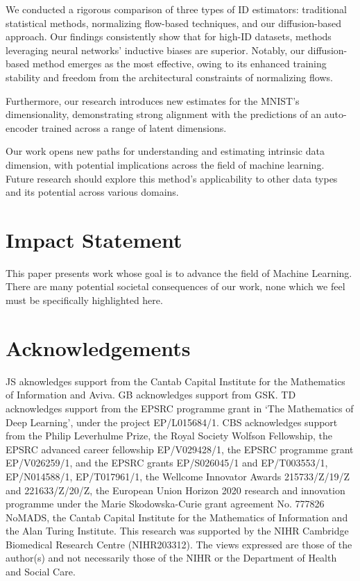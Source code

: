 We conducted a rigorous comparison of three types of ID estimators: traditional statistical methods, normalizing flow-based techniques, and our diffusion-based approach. Our findings consistently show that for high-ID datasets, methods leveraging neural networks' inductive biases are superior. Notably, our diffusion-based method emerges as the most effective, owing to its enhanced training stability and freedom from the architectural constraints of normalizing flows.

Furthermore, our research introduces new estimates for the MNIST's dimensionality, demonstrating strong alignment with the predictions of an auto-encoder trained across a range of latent dimensions.%

Our work opens new paths for understanding and estimating intrinsic data dimension, with potential implications across the field of machine learning. Future research should explore this method's applicability to other data types and its potential across various domains.

\section*{Impact Statement}
This paper presents work whose goal is to advance the field of Machine Learning. There are many potential societal consequences of our work, none which we feel must be specifically highlighted here.

\section*{Acknowledgements}
JS aknowledges support from the Cantab Capital Institute for the Mathematics of Information and Aviva. GB acknowledges support from GSK. TD acknowledges support from the EPSRC programme grant in `The Mathematics of Deep Learning', under the project EP/L015684/1. CBS acknowledges support from the Philip Leverhulme Prize, the Royal Society Wolfson Fellowship, the EPSRC advanced career fellowship EP/V029428/1, the EPSRC programme grant EP/V026259/1, and the EPSRC grants EP/S026045/1 and EP/T003553/1, EP/N014588/1, EP/T017961/1, the Wellcome Innovator Awards 215733/Z/19/Z and 221633/Z/20/Z, the European Union Horizon 2020 research and innovation programme under the Marie Skodowska-Curie grant agreement No. 777826 NoMADS, the Cantab Capital Institute for the Mathematics of Information and the Alan Turing Institute. This research was supported by the NIHR Cambridge Biomedical Research Centre (NIHR203312). The views expressed are those of the author(s) and not necessarily those of the NIHR or the Department of Health and Social Care.
